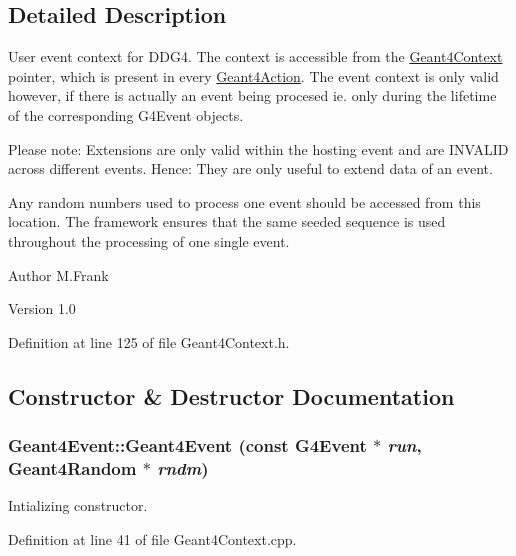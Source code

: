 \subsection{Detailed Description}
User event context for DDG4. The context is accessible from the \hyperlink{class_d_d4hep_1_1_simulation_1_1_geant4_context}{Geant4Context} pointer, which is present in every \hyperlink{class_d_d4hep_1_1_simulation_1_1_geant4_action}{Geant4Action}. The event context is only valid however, if there is actually an event being procesed ie. only during the lifetime of the corresponding G4Event objects.

Please note: Extensions are only valid within the hosting event and are INVALID across different events. Hence: They are only useful to extend data of an event.

Any random numbers used to process one event should be accessed from this location. The framework ensures that the same seeded sequence is used throughout the processing of one single event.

\begin{DoxyAuthor}{Author}
M.Frank 
\end{DoxyAuthor}
\begin{DoxyVersion}{Version}
1.0 
\end{DoxyVersion}


Definition at line 125 of file Geant4Context.h.

\subsection{Constructor \& Destructor Documentation}
\hypertarget{class_d_d4hep_1_1_simulation_1_1_geant4_event_a3e3bf4d4021aa3a90e66678f52b7f0e9}{
\subsubsection[{Geant4Event}]{\setlength{\rightskip}{0pt plus 5cm}Geant4Event::Geant4Event (const G4Event $\ast$ {\em run}, \/  {\bf Geant4Random} $\ast$ {\em rndm})}}
\label{class_d_d4hep_1_1_simulation_1_1_geant4_event_a3e3bf4d4021aa3a90e66678f52b7f0e9}


Intializing constructor. 

Definition at line 41 of file Geant4Context.cpp.

